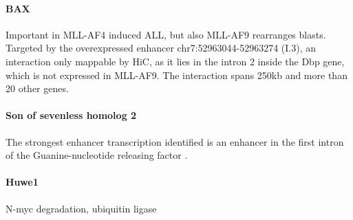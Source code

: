 \paragraph{BAX}

Important in MLL-AF4 induced ALL, but also MLL-AF9 rearranges blasts\cite{Benito2015}. Targeted by the overexpressed enhancer chr7:52963044-52963274 (I.3), an interaction only mappable by HiC, as it lies in the intron 2 inside the Dbp gene, which is not expressed in MLL-AF9. The interaction spans 250kb and more than 20 other genes. 

\paragraph{Son of sevenless homolog 2}
The strongest enhancer transcription identified is an enhancer in the first intron of the Guanine-nucleotide releasing factor . %


\paragraph{Huwe1}
N-myc degradation, ubiquitin ligase\cite{King2016}